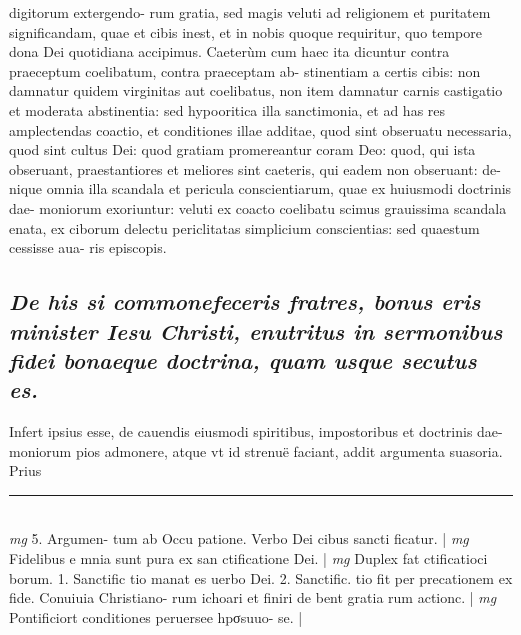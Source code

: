 \documentclass{article}
\begin{document}
\begin{pages}
digitorum extergendo- rum gratia, sed magis veluti ad religionem et puritatem significandam, quae et cibis inest, et in nobis quoque requiritur, quo tempore dona Dei quotidiana accipimus. Caeterùm cum haec ita dicuntur contra praeceptum coelibatum, contra praeceptam ab- stinentiam a certis cibis: non damnatur quidem virginitas aut coelibatus, non item damnatur carnis castigatio et moderata abstinentia: sed hypooritica illa sanctimonia, et ad has res amplectendas coactio, et conditiones illae additae, quod sint obseruatu necessaria, quod sint cultus Dei: quod gratiam promereantur coram Deo: quod, qui ista obseruant, praestantiores et meliores sint caeteris, qui eadem non obseruant: de- nique omnia illa scandala et pericula conscientiarum, quae ex huiusmodi doctrinis dae- moniorum exoriuntur: veluti ex coacto coelibatu scimus grauissima scandala enata, ex ciborum delectu periclitatas simplicium conscientias: sed quaestum cessisse aua- ris episcopis.  \pend
{}
{}
\subsection*{\textit{De his si commonefeceris fratres, bonus eris minister Iesu Christi, enutritus in sermonibus fidei bonaeque doctrina, quam usque secutus es. }}\pstart Infert ipsius esse, de cauendis eiusmodi spiritibus, impostoribus et doctrinis dae- moniorum pios admonere, atque vt id strenuë faciant, addit argumenta suasoria. Prius  \pend
\vspace{0.5cm}\noindent
\vspace{0.2cm}\rule{1cm}{0.2pt}\\ 
\hspace{0.2cm}\textit{mg}
\footnotesize 5. Argumen- tum ab Occu patione. Verbo Dei cibus sancti ficatur. 
\normalsize| 
\hspace{0.2cm}\textit{mg}
\footnotesize Fidelibus e mnia sunt pura ex san ctificatione Dei. 
\normalsize| 
\hspace{0.2cm}\textit{mg}
\footnotesize Duplex fat ctificatioci borum. 1. Sanctific tio manat es uerbo Dei. 2. Sanctific. tio fit per precationem ex fide. Conuiuia Christiano- rum ichoari et finiri de bent gratia rum actionc. 
\normalsize| 
\hspace{0.2cm}\textit{mg}
\footnotesize Pontificiort conditiones peruersee hpσsuuo- se. 
\normalsize| 

\end{pages}
\end{document}
